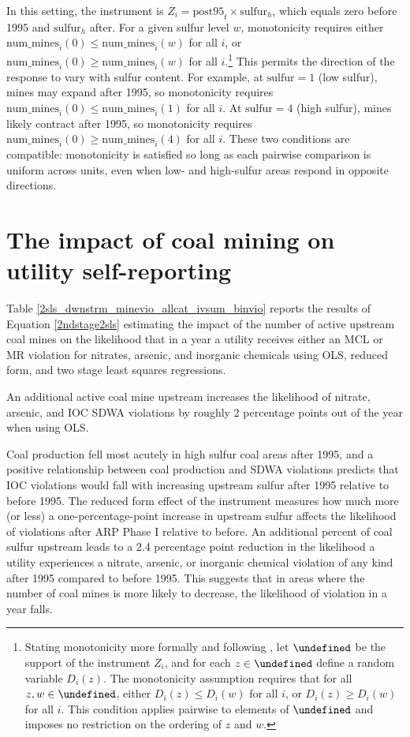 \documentclass{article}
\let\Psi\undefined
\begin{document}
In this setting, the instrument is $Z_i = \text{post95}_t \times \text{sulfur}_h$, which equals zero before 1995 and $\text{sulfur}_h$ after. For a given sulfur level $w$, monotonicity requires either $\text{num_mines}_i(0) \leq \text{num_mines}_i(w)$ for all $i$, or $\text{num_mines}_i(0) \geq \text{num_mines}_i(w)$ for all $i$.\footnote{Stating monotonicity more formally and following \textcite{angrist1994identification}, let $\Psi$ be the support of the instrument $Z_i$, and for each $z \in \Psi$ define a random variable $D_i(z)$. The monotonicity assumption requires that for all $z, w \in \Psi$, either $D_i(z) \leq D_i(w)$ for all $i$, or $D_i(z) \geq D_i(w)$ for all $i$. This condition applies pairwise to elements of $\Psi$ and imposes no restriction on the ordering of $z$ and $w$.} This permits the direction of the response to vary with sulfur content. For example, at $\text{sulfur} = 1$ (low sulfur), mines may expand after 1995, so monotonicity requires $\text{num_mines}_i(0) \leq \text{num_mines}_i(1)$ for all $i$. At $\text{sulfur} = 4$ (high sulfur), mines likely contract after 1995, so monotonicity requires $\text{num_mines}_i(0) \geq \text{num_mines}_i(4)$ for all $i$. These two conditions are compatible: monotonicity is satisfied so long as each pairwise comparison is uniform across units, even when low- and high-sulfur areas respond in opposite directions.

\section{The impact of coal mining on utility self-reporting}

Table \ref{2sls_dwnstrm_minevio_allcat_ivsum_binvio} reports the results of Equation \ref{2ndstage2sls} estimating the impact of the number of active upstream coal mines on the likelihood that in a year a utility receives either an MCL or MR violation for nitrates, arsenic, and inorganic chemicals using OLS, reduced form, and two stage least squares regressions. 

An additional active coal mine upstream increases the likelihood of nitrate, arsenic, and IOC SDWA violations by roughly 2 percentage points out of the year when using OLS.

Coal production fell most acutely in high sulfur coal areas after 1995, and a positive relationship between coal production and SDWA violations predicts that IOC violations would fall with increasing upstream sulfur after 1995 relative to before 1995. The reduced form effect of the instrument measures how much more (or less) a one-percentage-point increase in upstream sulfur affects the likelihood of violations after ARP Phase I relative to before. An additional percent of coal sulfur upstream leads to a 2.4 percentage point reduction in the likelihood a utility experiences a nitrate, arsenic, or inorganic chemical violation of any kind after 1995 compared to before 1995. This suggests that in areas where the number of coal mines is more likely to decrease, the likelihood of violation in a year falls.
\end{document}
